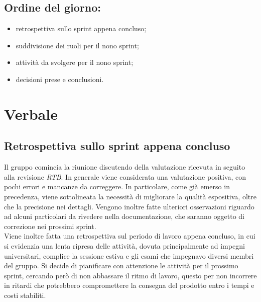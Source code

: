 \documentclass[italian,12pt]{article}
\begin{document}
\subsection*{Ordine del giorno:}
\begin{itemize}
	\item retrospettiva sullo sprint appena concluso;
	\item suddivisione dei ruoli per il nono sprint;
	\item attività da svolgere per il nono sprint;
	\item decisioni prese e conclusioni.
\end{itemize}


\newpage

\section{Verbale}

\subsection{Retrospettiva sullo sprint appena concluso}
Il gruppo comincia la riunione discutendo della valutazione ricevuta in seguito alla revisione \textit{RTB}. In generale viene considerata una valutazione positiva, con pochi errori e mancanze da correggere. In particolare, come già emerso in precedenza, viene sottolineata la necessità di migliorare la qualità espositiva, oltre che la precisione nei dettagli. Vengono inoltre fatte ulteriori osservazioni riguardo ad alcuni particolari da rivedere nella documentazione, che saranno oggetto di correzione nei prossimi sprint. \\
Viene inoltre fatta una retrospettiva sul periodo di lavoro appena concluso, in cui si evidenzia una lenta ripresa delle attività, dovuta principalmente ad impegni universitari, complice la sessione estiva e gli esami che impegnavo diversi membri del gruppo. Si decide di pianificare con attenzione le attività per il prossimo sprint, cercando però di non abbassare il ritmo di lavoro, questo per non incorrere in ritardi che potrebbero compromettere la consegna del prodotto entro i tempi e costi stabiliti.
\end{document}
